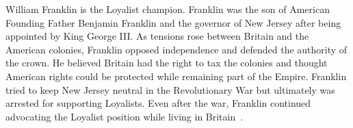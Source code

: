 \documentclass[jair,twoside,11pt,theapa]{article}
\begin{document}
William Franklin is the Loyalist champion.  Franklin was the son of American Founding Father Benjamin Franklin and the governor of New Jersey after being appointed by King George III.  As tensions rose between Britain and the American colonies, Franklin opposed independence and defended the authority of the crown.  He believed Britain had the right to tax the colonies and thought American rights could be protected while remaining part of the Empire. Franklin tried to keep New Jersey neutral in the Revolutionary War but ultimately was arrested for supporting Loyalists.  Even after the war, Franklin continued advocating the Loyalist position while living in Britain~.
\end{document}
